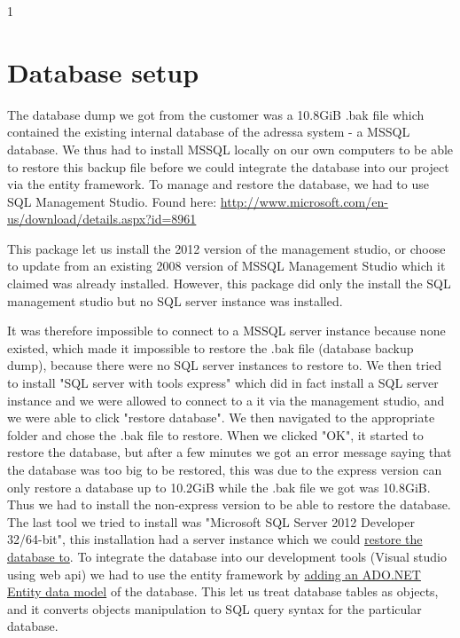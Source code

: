 1\section{Database setup}\label{dbSetup}
The database dump we got from the customer was a 10.8GiB .bak file which contained the existing internal database of the adressa system - a MSSQL database.
We thus had to install MSSQL locally on our own computers to be able to restore this backup file before we could integrate the database into our project via the entity framework. To manage and restore the database, we had to use SQL Management Studio. Found here: \href{http://www.microsoft.com/en-us/download/details.aspx?id=8961}{http://www.microsoft.com/en-us/download/details.aspx?id=8961}

This package let us install the 2012 version of the management studio, or choose to update from an existing 2008 version of MSSQL Management Studio which it claimed was already installed. However, this package did only the install the SQL management studio but no SQL server instance was installed.

It was therefore impossible to connect to a MSSQL server instance because none existed, which made it impossible to restore the .bak file (database backup dump), because there were no SQL server instances to restore to.
We then tried to install "SQL server with tools express" which did in fact install a SQL server instance and we were allowed to connect to a it via the management studio, and we were able to click "restore database". We then navigated to the appropriate folder and chose the .bak file to restore. When we clicked "OK", it started to restore the database, but after a few minutes we got an error message saying that the database was too big to be restored, this was due to the express version can only restore a database up to 10.2GiB while the .bak file we got was 10.8GiB. Thus we had to install the non-express version to be able to restore the database. The last tool we tried to install was "Microsoft SQL Server 2012 Developer 32/64-bit", this installation had a server instance which we could \href{http://www.katieandemil.com/sql-server-2012-restore-database-backup-file}{restore the database to}.
To integrate the database into our development tools (Visual studio using web api) we had to use the entity framework by \href{http://www.entityframeworktutorial.net/EntityFramework5/entity-framework5-introduction.aspx}{adding an ADO.NET Entity data model} of the database.
This let us treat database tables as objects, and it converts objects manipulation to SQL query syntax for the particular database.